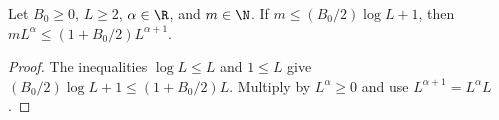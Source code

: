 \begin{lemma}
    \label{thm:peps_patch_count_polynomial}
    \leanok
    Let $B_0\ge0$, $L\ge2$, $\alpha\in\R$, and $m\in\N$.
    If $m\le(B_0/2)\log L+1$, then
    $mL^\alpha\le(1+B_0/2)L^{\alpha+1}$.
\end{lemma}
\begin{proof}
    \leanok
    The inequalities $\log L\le L$ and $1\le L$ give
    $(B_0/2)\log L+1\le(1+B_0/2)L$.
    Multiply by $L^\alpha\ge0$ and use $L^{\alpha+1}=L^\alpha L$.
\end{proof}
